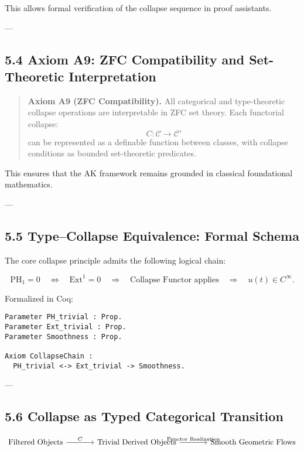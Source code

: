 \documentclass[11pt]{article}
\begin{document}
This allows formal verification of the collapse sequence in proof assistants.

---

\subsection*{5.4 Axiom A9: ZFC Compatibility and Set-Theoretic Interpretation}

\begin{quote}
\textbf{Axiom A9 (ZFC Compatibility).}  
All categorical and type-theoretic collapse operations are interpretable in ZFC set theory.  
Each functorial collapse:
\[
C: \mathcal{C} \to \mathcal{C}'
\]
can be represented as a definable function between classes,  
with collapse conditions as bounded set-theoretic predicates.
\end{quote}

This ensures that the AK framework remains grounded in classical foundational mathematics.

---

\subsection*{5.5 Type–Collapse Equivalence: Formal Schema}

The core collapse principle admits the following logical chain:

\[
\mathrm{PH}_1 = 0 \quad \Longleftrightarrow \quad 
\mathrm{Ext}^1 = 0 \quad \Longrightarrow \quad 
\text{Collapse Functor applies} \quad \Rightarrow \quad 
u(t) \in C^\infty.
\]

Formalized in Coq:

\begin{lstlisting}[language=Coq, caption=Collapse Typing Schema in Coq]
Parameter PH_trivial : Prop.
Parameter Ext_trivial : Prop.
Parameter Smoothness : Prop.

Axiom CollapseChain :
  PH_trivial <-> Ext_trivial -> Smoothness.
\end{lstlisting}

---

\subsection*{5.6 Collapse as Typed Categorical Transition}

\[
\begin{tikzcd}[column sep=large]
\text{Filtered Objects} \arrow[r, "C"]
& \text{Trivial Derived Objects} \arrow[r, "\text{Functor Realization}"]
& \text{Smooth Geometric Flows}
\end{tikzcd}
\]
\end{document}

